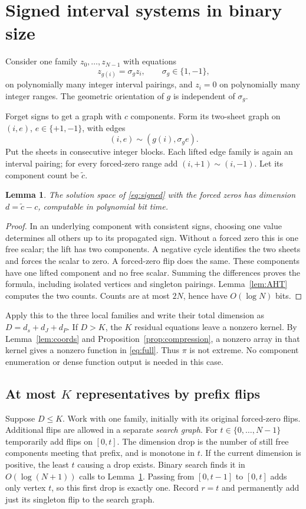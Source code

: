 \documentclass[11pt]{article}
\newtheorem{lemma}[theorem]{Lemma}
\begin{document}
\section{Signed interval systems in binary size}\label{sec:signed}
Consider one family $z_0,\ldots,z_{N-1}$ with equations
\begin{equation}\label{eq:signed}
 z_{g(i)}=\sigma_g z_i,\qquad \sigma_g\in\{1,-1\},
\end{equation}
on polynomially many integer interval pairings, and $z_i=0$ on polynomially many integer ranges. The geometric orientation of $g$ is independent of $\sigma_g$.

Forget signs to get a graph with $c$ components. Form its two-sheet graph on $(i,e)$, $e\in\{+1,-1\}$, with edges
\[
 (i,e)\sim(g(i),\sigma_g e).
\]
Put the sheets in consecutive integer blocks. Each lifted edge family is again an interval pairing; for every forced-zero range add $(i,+1)\sim(i,-1)$. Let its component count be $\widetilde c$.

\begin{lemma}\label{lem:dim}
The solution space of \eqref{eq:signed} with the forced zeros has dimension $d=\widetilde c-c$, computable in polynomial bit time.
\end{lemma}
\begin{proof}
In an underlying component with consistent signs, choosing one value determines all others up to its propagated sign. Without a forced zero this is one free scalar; the lift has two components. A negative cycle identifies the two sheets and forces the scalar to zero. A forced-zero flip does the same. These components have one lifted component and no free scalar. Summing the differences proves the formula, including isolated vertices and singleton pairings. Lemma~\ref{lem:AHT} computes the two counts. Counts are at most $2N$, hence have $O(\log N)$ bits.
\end{proof}

Apply this to the three local families and write their total dimension as $D=d_s+d_J+d_P$. If $D>K$, the $K$ residual equations leave a nonzero kernel. By Lemma~\ref{lem:coords} and Proposition~\ref{prop:compression}, a nonzero array in that kernel gives a nonzero function in \eqref{eq:full}. Thus $\pi$ is not extreme. No component enumeration or dense function output is needed in this case.

\subsection{At most $K$ representatives by prefix flips}
Suppose $D\leq K$. Work with one family, initially with its original forced-zero flips. Additional flips are allowed in a separate \emph{search graph}. For $t\in\{0,\ldots,N-1\}$ temporarily add flips on $[0,t]$. The dimension drop is the number of still free components meeting that prefix, and is monotone in $t$. If the current dimension is positive, the least $t$ causing a drop exists. Binary search finds it in $O(\log(N+1))$ calls to Lemma~\ref{lem:dim}. Passing from $[0,t-1]$ to $[0,t]$ adds only vertex $t$, so this first drop is exactly one. Record $r=t$ and permanently add just its singleton flip to the search graph.
\end{document}
